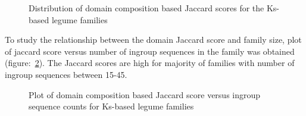 \documentclass{article}
\begin{document}
		\begin{figure}
			\caption{Distribution of domain composition based Jaccard scores for the Ks-based legume families}
			\label{fig:hist_domain_jaccard_scores_lgf5}
		\end{figure}
		
		To study the relationship between the domain Jaccard score and family size, plot of jaccard score versus number of ingroup sequences in the family was obtained (figure:~\ref{fig:scatter_domain_jaccard_vs_seq_ct_lgf5}). The Jaccard scores are high for majority of families with number of ingroup sequences between 15-45.
		
		\begin{figure}
			\caption{Plot of domain composition based Jaccard score versus ingroup sequence counts for Ks-based legume families}
			\label{fig:scatter_domain_jaccard_vs_seq_ct_lgf5}
		\end{figure}
		
\end{document}
